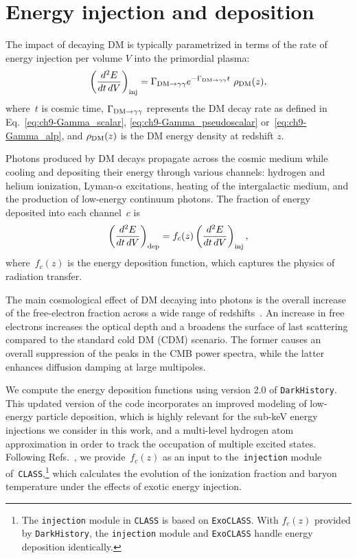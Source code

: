 \section{Energy injection and deposition} \label{sec:ch9-energy_injection}

The impact of decaying DM is typically parametrized in terms of the rate of energy injection per volume $V$ into the primordial plasma:
\begin{equation}
  \left(\frac{d^2E}{dt\, dV}\right)_{\rm{inj}} =  \Gamma_{\rm{DM}\to\gamma\gamma} e^{-\Gamma_{\rm{DM}\to\gamma\gamma}t} \ \rho_{\rm{DM}}(z),
\end{equation}
where~$t$ is cosmic time, $\Gamma_{\rm{DM}\to\gamma\gamma}$ represents the DM decay rate as defined in Eq.~\eqref{eq:ch9-Gamma_scalar}, \eqref{eq:ch9-Gamma_pseudoscalar} or~\eqref{eq:ch9-Gamma_alp}, and $\rho_{\rm{DM}}(z)$ is the DM energy density at redshift $z$.

Photons produced by DM decays propagate across the cosmic medium while cooling and depositing their energy through various channels: hydrogen and helium ionization, Lyman-$\alpha$ excitations, heating of the intergalactic medium, and the production of low-energy continuum photons.
The fraction of energy deposited into each channel~$c$ is
\begin{equation}
  \left(\frac{d^2E}{dt\, dV}\right)_{\rm{dep}} = f_c(z) \left(\frac{d^2E}{dt\, dV}\right)_{\rm{inj}},
  \label{eq:ch9-f_c}
\end{equation}
where~$f_c(z)$ is the energy deposition function, which captures the physics of radiation transfer.

The main cosmological effect of DM decaying into photons is the overall increase of the free-electron fraction across a wide range of redshifts~\cite{2012PhRvD..85d3522F, Slatyer:2016qyl}.
An increase in free electrons increases the optical depth and a broadens the surface of last scattering compared to the standard cold DM (CDM) scenario.
The former causes an overall suppression of the peaks in the CMB power spectra, while the latter enhances diffusion damping at large multipoles.

We compute the energy deposition functions using version 2.0 of \texttt{DarkHistory}.
This updated version of the code incorporates an improved modeling of low-energy particle deposition, which is highly relevant for the sub-keV energy injections we consider in this work, and a multi-level hydrogen atom approximation in order to track the occupation of multiple excited states.
Following Refs.~\cite{Liu:2023nct, Capozzi:2023xie, 2024arXiv240813305X}, we provide~$f_c(z)$ as an input to the~\texttt{injection} module of~\texttt{CLASS},\footnote{The \texttt{injection} module in \texttt{CLASS} is based on \texttt{ExoCLASS}. With $f_c(z)$ provided by \texttt{DarkHistory}, the \texttt{injection} module and \texttt{ExoCLASS} handle energy deposition identically.} which calculates the evolution of the ionization fraction and baryon temperature under the effects of exotic energy injection.

